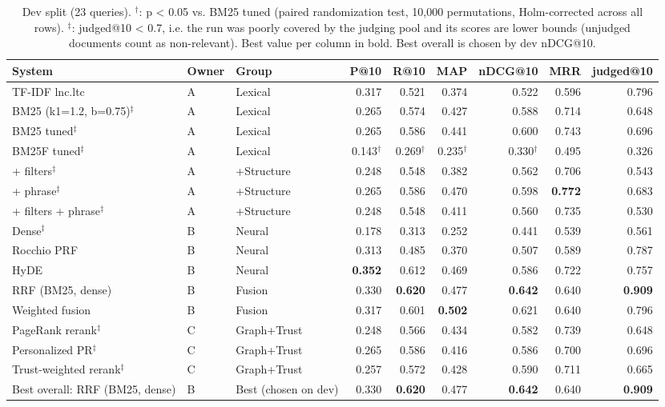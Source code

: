 \begin{table}[t]
\centering
\small
\begin{tabular}{lllrrrrrr}
\toprule
System & Owner & Group & P@10 & R@10 & MAP & nDCG@10 & MRR & judged@10 \\
\midrule
TF-IDF lnc.ltc & A & Lexical & 0.317 & 0.521 & 0.374 & 0.522 & 0.596 & 0.796 \\
BM25 (k1=1.2, b=0.75)$^\ddagger$ & A & Lexical & 0.265 & 0.574 & 0.427 & 0.588 & 0.714 & 0.648 \\
BM25 tuned$^\ddagger$ & A & Lexical & 0.265 & 0.586 & 0.441 & 0.600 & 0.743 & 0.696 \\
BM25F tuned$^\ddagger$ & A & Lexical & 0.143$^\dagger$ & 0.269$^\dagger$ & 0.235$^\dagger$ & 0.330$^\dagger$ & 0.495 & 0.326 \\
\midrule
+ filters$^\ddagger$ & A & +Structure & 0.248 & 0.548 & 0.382 & 0.562 & 0.706 & 0.543 \\
+ phrase$^\ddagger$ & A & +Structure & 0.265 & 0.586 & 0.470 & 0.598 & \textbf{0.772} & 0.683 \\
+ filters + phrase$^\ddagger$ & A & +Structure & 0.248 & 0.548 & 0.411 & 0.560 & 0.735 & 0.530 \\
\midrule
Dense$^\ddagger$ & B & Neural & 0.178 & 0.313 & 0.252 & 0.441 & 0.539 & 0.561 \\
Rocchio PRF & B & Neural & 0.313 & 0.485 & 0.370 & 0.507 & 0.589 & 0.787 \\
HyDE & B & Neural & \textbf{0.352} & 0.612 & 0.469 & 0.586 & 0.722 & 0.757 \\
\midrule
RRF (BM25, dense) & B & Fusion & 0.330 & \textbf{0.620} & 0.477 & \textbf{0.642} & 0.640 & \textbf{0.909} \\
Weighted fusion & B & Fusion & 0.317 & 0.601 & \textbf{0.502} & 0.621 & 0.640 & 0.796 \\
\midrule
PageRank rerank$^\ddagger$ & C & Graph+Trust & 0.248 & 0.566 & 0.434 & 0.582 & 0.739 & 0.648 \\
Personalized PR$^\ddagger$ & C & Graph+Trust & 0.265 & 0.586 & 0.416 & 0.586 & 0.700 & 0.696 \\
Trust-weighted rerank$^\ddagger$ & C & Graph+Trust & 0.257 & 0.572 & 0.428 & 0.590 & 0.711 & 0.665 \\
\midrule
Best overall: RRF (BM25, dense) & B & Best (chosen on dev) & 0.330 & \textbf{0.620} & 0.477 & \textbf{0.642} & 0.640 & \textbf{0.909} \\
\bottomrule
\end{tabular}
\caption{Dev split (23 queries). $^\dagger$: p < 0.05 vs. BM25 tuned (paired randomization test, 10,000 permutations, Holm-corrected across all rows). $^\ddagger$: judged@10 < 0.7, i.e. the run was poorly covered by the judging pool and its scores are lower bounds (unjudged documents count as non-relevant). Best value per column in bold. Best overall is chosen by dev nDCG@10.}
\label{tab:ablation-dev}
\end{table}

